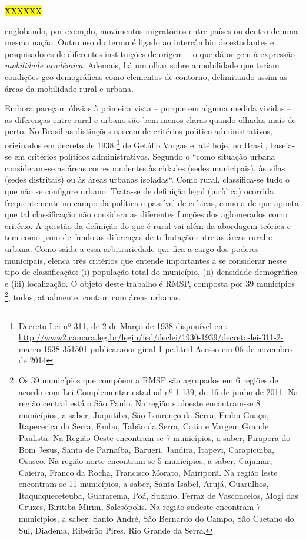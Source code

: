 \hl{XXXXXX}

 englobando, por exemplo, movimentos migratórios entre países ou dentro de uma mesma nação. Outro uso do termo é ligado ao intercâmbio de estudantes e pesquisadores de diferentes instituições de origem – o que dá origem à expressão \emph{mobilidade acadêmica}. Ademais, há um olhar sobre a mobilidade que teriam condições geo-demográficas como elementos de contorno, delimitando assim as áreas da mobilidade rural e urbana.
 
Embora pareçam óbvias à primeira vista – porque em alguma medida vividas – as diferenças entre rural e urbano são bem menos claras quando olhadas mais de perto. No Brasil as distinções nascem de critérios político-administrativos, originados em decreto de 1938
\footnote{Decreto-Lei nº 311, de 2 de Março de 1938 disponível em: \url{http://www2.camara.leg.br/legin/fed/declei/1930-1939/decreto-lei-311-2-marco-1938-351501-publicacaooriginal-1-pe.html} Acesso em 06 de novembro de 2014}
de Getúlio Vargas e, até hoje, no Brasil, baseia-se em critérios políticos administrativos. Segundo o \cite{IBGE2001, p.63} “como situação urbana consideram-se as áreas correspondentes às cidades (sedes municipais), às vilas (sedes distritais) ou às áreas urbanas isoladas“. Como rural, classifica-se tudo o que não se configure urbano. Trata-se de definição legal (jurídica) ocorrida frequentemente no campo da política e passível de críticas, como a de \cite{GRABOIS2001} que aponta que tal classificação não considera as diferentes funções dos aglomerados como critério. A questão da definição do que é rural vai além da abordagem teórica e tem como pano de fundo as diferenças de tributação entre as áreas rural e urbana. Como saída a essa arbitrariedade que fica a cargo dos poderes municipais, \cite{VEIGA2002} elenca três critérios que entende importantes a se considerar nesse tipo de classificação: (i) população total do município, (ii) densidade demográfica e (iii) localização.
O objeto deste trabalho é RMSP, composta por 39 municípios
\footnote{Os 39 municípios que compõem a RMSP são agrupados em 6 regiões de acordo com Lei Complementar estadual nº 1.139, de 16 de junho de 2011. Na região central está o São Paulo. Na região sudoeste encontram-se 8 municípios, a saber, Juquitiba, São Lourenço da Serra, Embu-Guaçu, Itapecerica da Serra, Embu, Tabão da Serra, Cotia e Vargem Grande Paulista. Na Região Oeste encontram-se 7 municípios, a saber, Pirapora do Bom Jesus, Santa de Parnaíba, Barueri, Jandira, Itapevi, Carapicuiba, Osasco. Na região norte encontram-se 5 municípios, a saber, Cajamar, Caieira, Franco da Rocha, Francisco Morato, Mairiporã. Na região leste encontram-se 11 municípios, a saber, Santa Isabel, Arujá, Guarulhos, Itaquaqueceteuba, Guararema, Poá, Suzano, Ferraz de Vasconcelos, Mogi das Cruzes, Biritiba Mirim, Salesópolis. Na região sudeste encontram 7 municípios, a saber, Santo André, São Bernardo do Campo, São Caetano do Sul, Diadema, Ribeirão Pires, Rio Grande da Serra.}, todos, atualmente, contam com áreas urbanas. 
